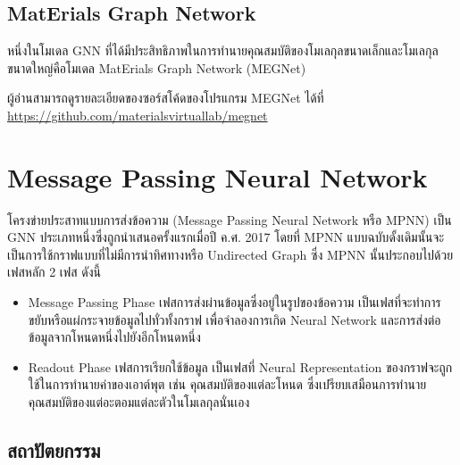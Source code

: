 \subsection{MatErials Graph Network}
\label{ssec:megnet}

หนึ่งในโมเดล GNN ที่ได้มีประสิทธิภาพในการทำนายคุณสมบัติของโมเลกุลขนาดเล็กและโมเลกุลขนาดใหญ่คือโมเดล MatErials Graph Network 
(MEGNet)\autocite{chen2019}

ผู้อ่านสามารถดูรายละเอียดของซอร์สโค้ดของโปรแกรม MEGNet ได้ที่ \url{https://github.com/materialsvirtuallab/megnet}

\section{Message Passing Neural Network}
\label{sec:mpnn}

โครงข่ายประสาทแบบการส่งข้อความ (Message Passing Neural Network หรือ MPNN) เป็น GNN ประเภทหนึ่งซึ่งถูกนำเสนอครั้งแรกเมื่อปี 
ค.ศ. 2017\autocite{gilmer2017} โดยที่ MPNN แบบฉบับดั้งเดิมนั้นจะเป็นการใช้กราฟแบบที่ไม่มีการนำทิศทางหรือ Undirected Graph
ซึ่ง MPNN นั้นประกอบไปด้วยเฟสหลัก 2 เฟส ดังนี้ 

\begin{itemize}
    \item Message Passing Phase เฟสการส่งผ่านข้อมูลซึ่งอยู่ในรูปของข้อความ เป็นเฟสที่จะทำการขยับหรือแผ่กระจายข้อมูลไปทั่วทั้งกราฟ%
    เพื่อจำลองการเกิด Neural Network และการส่งต่อข้อมูลจากโหนดหนึ่งไปยังอีกโหนดหนึ่ง
    
    \item Readout Phase เฟสการเรียกใช้ข้อมูล เป็นเฟสที่ Neural Representation ของกราฟจะถูกใช้ในการทำนายค่าของเอาต์พุต เช่น
    คุณสมบัติของแต่ละโหนด ซึ่งเปรียบเสมือนการทำนายคุณสมบัติของแต่อะตอมแต่ละตัวในโมเลกุลนั่นเอง
\end{itemize}

\subsection{สถาปัตยกรรม}
\label{ssec:mpnn_architect}

